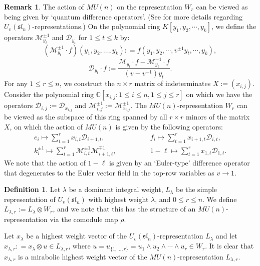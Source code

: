 \documentclass{amsart}
\numberwithin{equation}{section}
\theoremstyle{theorem}
\theoremstyle{definition}
\newtheorem{remark}[theorem]{Remark}
\newtheorem{definition}[theorem]{Definition}
\newcommand{\CC}{\mathbb{C}}
\newcommand{\dd}{\mathcal{D}}
\newcommand{\mm}{\mathcal{M}}
\newcommand{\sll}{\mathfrak{sl}}
\newcommand{\uvsln}{U_v(\sll_n)}
\begin{document}
\begin{remark}
The action of $MU(n)$ on the representation $W_r$ can be viewed as being given by `quantum difference operators'. (See \cite[5A.6]{J} for more details regarding $\uvsln$-representations.) On the polynomial ring $K[y_1, y_2,\cdots, y_k]$, we define the operators $\mm_{y_t}^{\pm1}$ and $\dd_{y_t}$ for $1\leq t\leq k$ by:
\[(\mm_{y_t}^{\pm1}\cdot f)(y_1,y_2,\dots, y_k): = f(y_1,y_2,\cdots, v^{\pm1}y_t,\cdots, y_k),\]
\[\dd_{y_t}\cdot f:=\frac{\mm_{y_t}\cdot f - \mm_{y_t}^{-1}\cdot f }{(v-v^{-1})y_t}.
\]
For any $1\leq r\leq n$, we construct the $n\times r$ matrix of indeterminates $X:=(x_{i,j})$. Consider the polynomial ring $\CC[x_{i,j}:1\leq i\leq n, 1\leq j\leq r]$ on which we have the operators $\dd_{i,j}:=\dd_{x_{i,j}}$ and $\mm_{i,j}^{\pm1}:=\mm_{x_{i,j}}^{\pm1}$. The $MU(n)$-representation $W_r$ can be viewed as the subspace of this ring spanned by all $r\times  r$ minors of the matrix $X$, on which the action of $MU(n)$ is given by the following operators:
\begin{align*}
e_i \mapsto \sum_{t=1}^r x_{i,t} \dd_{i+1,t},& \qquad \qquad f_i \mapsto \sum_{t=1}^r x_{i+1,t} \dd_{i,t},\\
k_i^{\pm 1} \mapsto  \sum_{t=1}^r \mm_{i,t}^{\pm1}\mm_{i+1,t}^{\mp1},& \qquad \qquad 1-\ell\mapsto \sum_{t=1}^r x_{1,t} \dd_{1,t}.
\end{align*}
We note that the action of $1-\ell$ is given by an `Euler-type' difference operator that degenerates to the Euler vector field in the top-row variables as $v\to 1$.
\end{remark}


\begin{definition}
Let $\lambda$ be a dominant integral weight, $L_{\lambda}$ be the simple representation of $\uvsln$ with highest weight $\lambda$, and $0\leq r\leq n$. We define $L_{\lambda, r}:=L_\lambda\otimes W_r$, and we note that this has the structure of an $MU(n)$-representation via the comodule map $\rho$.
\end{definition}


Let $x_{\lambda}$ be a highest weight vector of the $\uvsln$-representation $L_{\lambda}$ and let $x_{\lambda,r}: = x_{\lambda} \otimes u\in L_{\lambda,r}$, where $u=u_{\{1,\ldots,r\}}=u_1\wedge u_2\wedge \cdots \wedge u_r \in W_r$. It is clear that $x_{\lambda,r}$ is a mirabolic highest weight vector of the $MU(n)$-representation $L_{\lambda,r}$.
\end{document}

